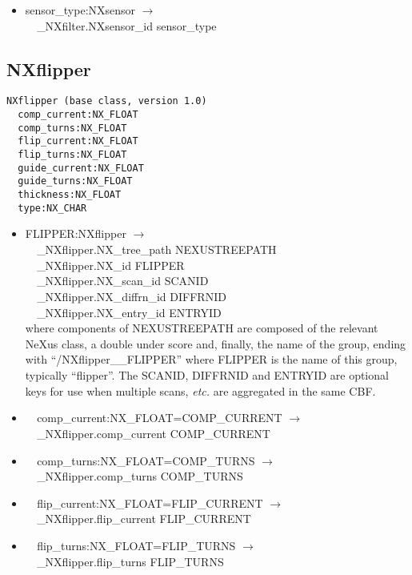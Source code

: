 \documentclass[11pt]{article}
\begin{document}
{{\begin{itemize}
\item{sensor\_type:NXsensor $\rightarrow$\\
\verb|  |\_NXfilter.NXsensor\_id sensor\_type}
\end{itemize}
\subsection{NXflipper}

\begin{verbatim}
NXflipper (base class, version 1.0)
  comp_current:NX_FLOAT
  comp_turns:NX_FLOAT
  flip_current:NX_FLOAT
  flip_turns:NX_FLOAT
  guide_current:NX_FLOAT
  guide_turns:NX_FLOAT
  thickness:NX_FLOAT
  type:NX_CHAR
\end{verbatim}

\begin{itemize}

\item{FLIPPER:NXflipper $\rightarrow$\\
\verb|  |\_NXflipper.NX\_tree\_path    NEXUSTREEPATH \\
\verb|  |\_NXflipper.NX\_id            FLIPPER\\
\verb|  |\_NXflipper.NX\_scan\_id      SCANID \\
\verb|  |\_NXflipper.NX\_diffrn\_id    DIFFRNID \\
\verb|  |\_NXflipper.NX\_entry\_id     ENTRYID \\
where components of NEXUSTREEPATH are composed of the
relevant NeXus class, a double under score and, finally, the
name of the group, ending with ``/NXflipper\_\_FLIPPER''
where FLIPPER is the name of this group, typically ``flipper''.
The SCANID, DIFFRNID and ENTRYID are optional keys for use
when multiple scans, {\it etc.} are aggregated in the same CBF.}

\item{\verb|  |comp\_current:NX\_FLOAT=COMP\_CURRENT $\rightarrow$\\
\verb|  |\_NXflipper.comp\_current COMP\_CURRENT}

\item{\verb|  |comp\_turns:NX\_FLOAT=COMP\_TURNS $\rightarrow$\\
\verb|  |\_NXflipper.comp\_turns COMP\_TURNS}

\item{\verb|  |flip\_current:NX\_FLOAT=FLIP\_CURRENT $\rightarrow$\\
\verb|  |\_NXflipper.flip\_current FLIP\_CURRENT}

\item{\verb|  |flip\_turns:NX\_FLOAT=FLIP\_TURNS $\rightarrow$\\
\verb|  |\_NXflipper.flip\_turns FLIP\_TURNS}


\end{itemize}}}
\end{document}
